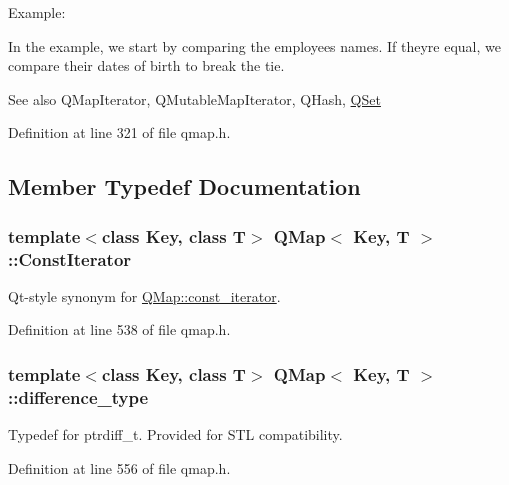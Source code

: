 Example\+: 
\begin{DoxyCodeInclude}
\end{DoxyCodeInclude}
 In the example, we start by comparing the employees\textquotesingle{} names. If they\textquotesingle{}re equal, we compare their dates of birth to break the tie.

\begin{DoxySeeAlso}{See also}
Q\+Map\+Iterator, Q\+Mutable\+Map\+Iterator, Q\+Hash, \hyperlink{class_q_set}{Q\+Set} 
\end{DoxySeeAlso}


Definition at line 321 of file qmap.\+h.



\subsection{Member Typedef Documentation}
\subsubsection[{\texorpdfstring{Const\+Iterator}{ConstIterator}}]{\setlength{\rightskip}{0pt plus 5cm}template$<$class Key, class T$>$ {\bf Q\+Map}$<$ Key, T $>$\+::{\bf Const\+Iterator}}\hypertarget{class_q_map_ae0df3c69b27f3a8ceeab8244a59477ff}{}\label{class_q_map_ae0df3c69b27f3a8ceeab8244a59477ff}
Qt-\/style synonym for \hyperlink{class_q_map_1_1const__iterator}{Q\+Map\+::const\+\_\+iterator}. 

Definition at line 538 of file qmap.\+h.

\subsubsection[{\texorpdfstring{difference\+\_\+type}{difference_type}}]{\setlength{\rightskip}{0pt plus 5cm}template$<$class Key, class T$>$ {\bf Q\+Map}$<$ Key, T $>$\+::{\bf difference\+\_\+type}}\hypertarget{class_q_map_a5f2bff0c8014b0b8142982d17728d0ca}{}\label{class_q_map_a5f2bff0c8014b0b8142982d17728d0ca}
Typedef for ptrdiff\+\_\+t. Provided for S\+TL compatibility. 

Definition at line 556 of file qmap.\+h.

